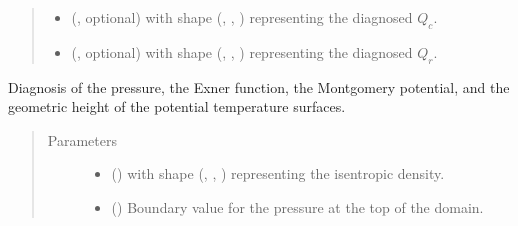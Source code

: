 \documentclass[letterpaper,10pt,english]{sphinxmanual}
\begin{document}
\begin{fulllineitems}
\begin{fulllineitems}
\begin{quote}
\begin{description}
\begin{itemize}
\item {} 
 (, optional) \textendash{}  with shape (, , ) representing the diagnosed \(Q_c\).

\item {} 
 (, optional) \textendash{}  with shape (, , ) representing the diagnosed \(Q_r\).

\end{itemize}


\end{description}\end{quote}

\end{fulllineitems}


\begin{fulllineitems}
\label{\detokenize{api:dycore.diagnostic_isentropic.DiagnosticIsentropic.get_diagnostic_variables}}
Diagnosis of the pressure, the Exner function, the Montgomery potential, and the geometric height of the
potential temperature surfaces.
\begin{quote}\begin{description}
\item[{Parameters}] \leavevmode\begin{itemize}
\item {} 
 () \textendash{}  with shape (, , ) representing the isentropic density.

\item {} 
 () \textendash{} Boundary value for the pressure at the top of the domain.

\end{itemize}


\end{description}
\end{quote}
\end{fulllineitems}
\end{fulllineitems}
\end{document}
